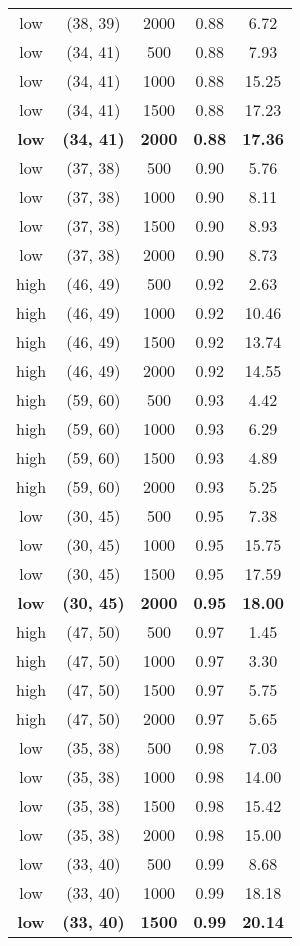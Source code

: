 \begin{tabular}{c c c c c}
low & (38, 39) &  2000 & 0.88 & 6.72 \\
low & (34, 41) &  500 & 0.88 & 7.93 \\
low & (34, 41) &  1000 & 0.88 & 15.25 \\
low & (34, 41) &  1500 & 0.88 & 17.23 \\
\textbf{low} & \textbf{(34, 41)} & \textbf{ 2000} & \textbf{0.88} & \textbf{17.36} \\
low & (37, 38) &  500 & 0.90 & 5.76 \\
low & (37, 38) &  1000 & 0.90 & 8.11 \\
low & (37, 38) &  1500 & 0.90 & 8.93 \\
low & (37, 38) &  2000 & 0.90 & 8.73 \\
high & (46, 49) &  500 & 0.92 & 2.63 \\
high & (46, 49) &  1000 & 0.92 & 10.46 \\
high & (46, 49) &  1500 & 0.92 & 13.74 \\
high & (46, 49) &  2000 & 0.92 & 14.55 \\
high & (59, 60) &  500 & 0.93 & 4.42 \\
high & (59, 60) &  1000 & 0.93 & 6.29 \\
high & (59, 60) &  1500 & 0.93 & 4.89 \\
high & (59, 60) &  2000 & 0.93 & 5.25 \\
low & (30, 45) &  500 & 0.95 & 7.38 \\
low & (30, 45) &  1000 & 0.95 & 15.75 \\
low & (30, 45) &  1500 & 0.95 & 17.59 \\
\textbf{low} & \textbf{(30, 45)} & \textbf{ 2000} & \textbf{0.95} & \textbf{18.00} \\
high & (47, 50) &  500 & 0.97 & 1.45 \\
high & (47, 50) &  1000 & 0.97 & 3.30 \\
high & (47, 50) &  1500 & 0.97 & 5.75 \\
high & (47, 50) &  2000 & 0.97 & 5.65 \\
low & (35, 38) &  500 & 0.98 & 7.03 \\
low & (35, 38) &  1000 & 0.98 & 14.00 \\
low & (35, 38) &  1500 & 0.98 & 15.42 \\
low & (35, 38) &  2000 & 0.98 & 15.00 \\
low & (33, 40) &  500 & 0.99 & 8.68 \\
low & (33, 40) &  1000 & 0.99 & 18.18 \\
\textbf{low} & \textbf{(33, 40)} & \textbf{ 1500} & \textbf{0.99} & \textbf{20.14} \\

\end{tabular}
